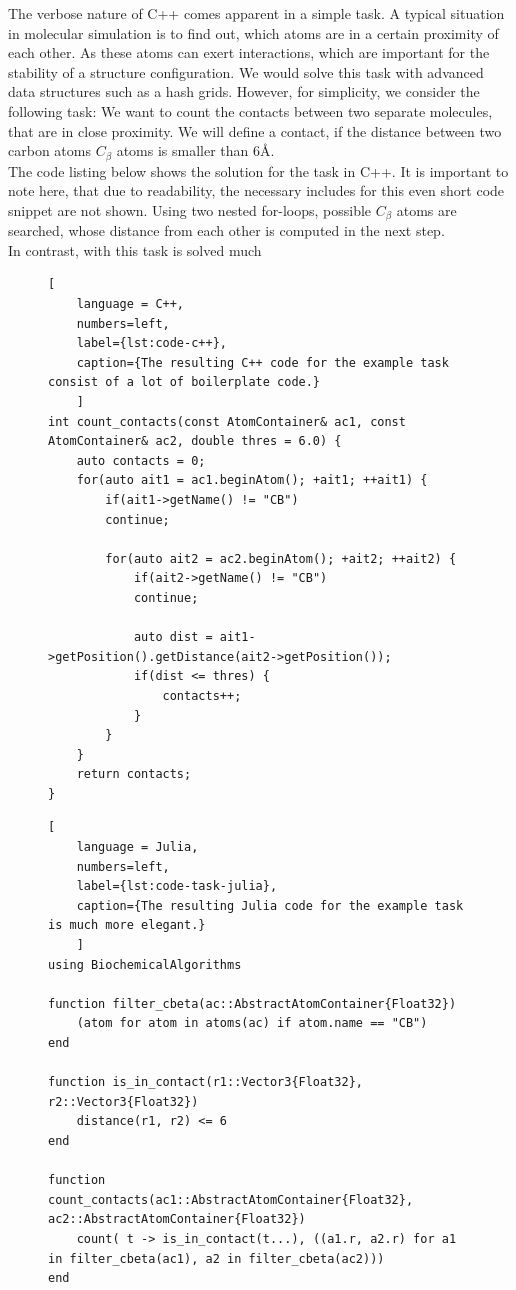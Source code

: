 The verbose nature of C++ comes apparent in a simple task. A typical situation in molecular simulation is to find out, which atoms are in a certain proximity of each other. As these atoms can exert interactions, which are important for the stability of a structure configuration. We would solve this task with advanced data structures such as a hash grids. However, for simplicity, we consider the following task: We want to count the contacts between two separate molecules, that are in close proximity. We will define a contact, if the distance between two carbon atoms $C_\beta$ atoms is smaller than $6$\AA. \\

The code listing below shows the solution for the task in C++. It is important to note here, that due to readability, the necessary includes for this even short code snippet are not shown. Using two nested for-loops, possible $C_\beta$ atoms are searched, whose distance from each other is computed in the next step. \\
In contrast, with \biochem this task is solved much
\begin{figure}
\begin{lstlisting}[
	language = C++, 
	numbers=left, 
	label={lst:code-c++}, 
	caption={The resulting C++ code for the example task consist of a lot of boilerplate code.}
	]
int count_contacts(const AtomContainer& ac1, const AtomContainer& ac2, double thres = 6.0) {
	auto contacts = 0;
	for(auto ait1 = ac1.beginAtom(); +ait1; ++ait1) {
		if(ait1->getName() != "CB")
		continue;
		
		for(auto ait2 = ac2.beginAtom(); +ait2; ++ait2) {
			if(ait2->getName() != "CB")
			continue;
			
			auto dist = ait1->getPosition().getDistance(ait2->getPosition());
			if(dist <= thres) {
				contacts++;
			}
		}
	}
	return contacts;
}
\end{lstlisting}
\end{figure}


\begin{figure}
\begin{lstlisting}[
	language = Julia, 
	numbers=left, 
	label={lst:code-task-julia}, 
	caption={The resulting Julia code for the example task is much more elegant.}
	]
using BiochemicalAlgorithms 
	
function filter_cbeta(ac::AbstractAtomContainer{Float32})
	(atom for atom in atoms(ac) if atom.name == "CB")
end
	
function is_in_contact(r1::Vector3{Float32}, r2::Vector3{Float32})
	distance(r1, r2) <= 6
end
	
function count_contacts(ac1::AbstractAtomContainer{Float32}, ac2::AbstractAtomContainer{Float32})
	count( t -> is_in_contact(t...), ((a1.r, a2.r) for a1 in filter_cbeta(ac1), a2 in filter_cbeta(ac2)))
end
\end{lstlisting}
\end{figure}

